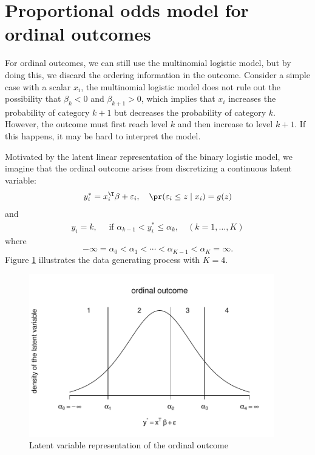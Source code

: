 \section{Proportional odds model for ordinal outcomes}

For ordinal outcomes, we can still use the multinomial logistic model,
but by doing this, we discard the ordering information in the outcome.
Consider a simple case with a scalar $x_i$, the multinomial logistic model does not rule out the possibility that $\beta_k < 0$ and $\beta_{k+1} >0$, which implies that $x_i$ increases the probability of category $k+1$ but decreases the probability of category $k$. However, the outcome must first reach level $k$ and then increase to level $k+1$. If this happens, it may be hard to interpret the model. 

Motivated
by the latent linear representation of the binary logistic model,
we imagine that the ordinal outcome arises from discretizing a continuous
latent variable:
\begin{eqnarray}
\label{eq::latent-ordinal}
y_{i}^{*}  =x_{i}^{\T}\beta+\varepsilon_{i},\quad\pr(\varepsilon_{i}\leq z\mid x_{i})=g(z)
\end{eqnarray}
and
\begin{eqnarray}
\label{eq::discretization-ordinal}
y_{i} =k,\quad\text{ if }\alpha_{k-1} <  y_{i}^{*}\leq\alpha_{k},\quad(k=1,\ldots,K)
\end{eqnarray}
where 
\[
-\infty=\alpha_{0}<\alpha_{1}<\cdots<\alpha_{K-1}<\alpha_{K}=\infty.
\]
Figure \ref{fig::latent-ordinal} illustrates the data generating process with $K=4.$

\begin{figure}
\centering
\includegraphics[width = 0.95\textwidth]{figures/ordinal_latent.pdf}
\caption{Latent variable representation of the ordinal outcome}
\label{fig::latent-ordinal}
\end{figure}



